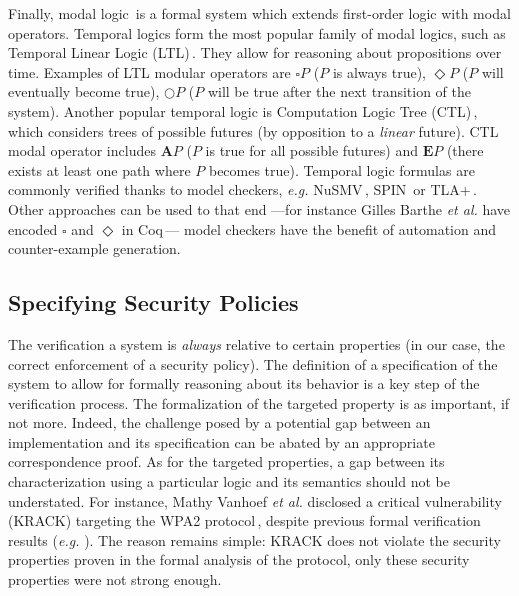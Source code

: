 Finally, modal logic\,\cite{chagrov1997modal} is a formal system which extends
first-order logic with modal operators.
%
Temporal logics form the most popular family of modal logics, such as Temporal
Linear Logic (LTL)\,\cite{sistla1985ltl}.
%
They allow for reasoning about propositions over time.
%
Examples of LTL modular operators are \( \square P \) (\( P \) is always true),
\( \Diamond P \) (\( P \) will eventually become true), \( \bigcirc P \)
(\( P \) will be true after the next transition of the system).
%
Another popular temporal logic is Computation Logic Tree
(CTL)\,\cite{clarke1981ctl}, which considers trees of possible futures (by
opposition to a \emph{linear} future).
%
CTL modal operator includes \( \mathbf{A} P \) (\( P \) is true for all possible
futures) and \( \mathbf{E} P \) (there exists at least one path where \( P \)
becomes true).
%
Temporal logic formulas are commonly verified thanks to model checkers,
\emph{e.g.}  NuSMV\,\cite{cimatti2002nusmv}, SPIN\,\cite{holzmann1997spin} or
TLA+\,\cite{lamport2002tla}.
%
Other approaches can be used to that end ---for instance Gilles Barthe \emph{et
  al.} have encoded \( \square \) and \( \Diamond \) in
Coq\,\cite{barthe2011virtcert1}--- model checkers have the benefit of
automation and counter-example generation.

\subsection{Specifying Security Policies}
\label{sec:sota:security}

The verification a system is \emph{always} relative to certain properties (in
our case, the correct enforcement of a security policy).
%
The definition of a specification of the system to allow for formally reasoning
about its behavior is a key step of the verification process.
%
The formalization of the targeted property is as important, if not more.
%
Indeed, the challenge posed by a potential gap between an implementation and its
specification can be abated by an appropriate correspondence proof.
%
As for the targeted properties, a gap between its characterization using a
particular logic and its semantics should not be understated.
%
For instance, Mathy Vanhoef \emph{et al.} disclosed a critical vulnerability
(KRACK) targeting the WPA2 protocol\,\cite{vanhoef2017key}, despite previous
formal verification results (\emph{e.g.} \cite{he2004analysis}).
%
The reason remains simple: KRACK does not violate the security properties proven
in the formal analysis of the protocol, only these security properties were not
strong enough.

